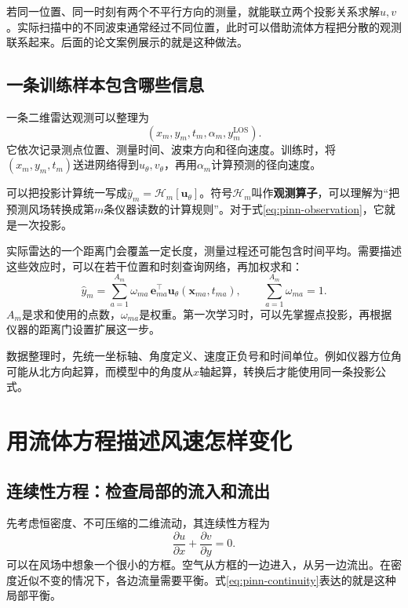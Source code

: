 若同一位置、同一时刻有两个不平行方向的测量，就能联立两个投影关系求解$u,v$。实际扫描中的不同波束通常经过不同位置，此时可以借助流体方程把分散的观测联系起来。后面的论文案例展示的就是这种做法。

\subsection{一条训练样本包含哪些信息}
一条二维雷达观测可以整理为
\[
 (x_m,y_m,t_m,\alpha_m,y_m^{\mathrm{LOS}}).
\]
它依次记录测点位置、测量时间、波束方向和径向速度。训练时，将$(x_m,y_m,t_m)$送进网络得到$u_\theta,v_\theta$，再用$\alpha_m$计算预测的径向速度。

可以把投影计算统一写成$\widehat y_m=\mathcal H_m[\mathbf u_\theta]$。符号$\mathcal H_m$叫作\textbf{观测算子}，可以理解为“把预测风场转换成第$m$条仪器读数的计算规则”。对于式\eqref{eq:pinn-observation}，它就是一次投影。

实际雷达的一个距离门会覆盖一定长度，测量过程还可能包含时间平均。需要描述这些效应时，可以在若干位置和时刻查询网络，再加权求和：
\begin{equation}
 \widehat y_m=\sum_{a=1}^{A_m}\omega_{ma}\,
 \mathbf e_{ma}^{\top}\mathbf u_\theta(\mathbf x_{ma},t_{ma}),
 \qquad \sum_{a=1}^{A_m}\omega_{ma}=1.
\end{equation}
$A_m$是求和使用的点数，$\omega_{ma}$是权重。第一次学习时，可以先掌握点投影，再根据仪器的距离门设置扩展这一步\cite{sathe2013lidar}。

数据整理时，先统一坐标轴、角度定义、速度正负号和时间单位。例如仪器方位角可能从北方向起算，而模型中的角度从$x$轴起算，转换后才能使用同一条投影公式。

\section{用流体方程描述风速怎样变化}
\label{sec:pinn-physics}

\subsection{连续性方程：检查局部的流入和流出}
先考虑恒密度、不可压缩的二维流动，其连续性方程为
\begin{equation}
 \frac{\partial u}{\partial x}+\frac{\partial v}{\partial y}=0.
 \label{eq:pinn-continuity}
\end{equation}
可以在风场中想象一个很小的方框。空气从方框的一边进入，从另一边流出。在密度近似不变的情况下，各边流量需要平衡。式\eqref{eq:pinn-continuity}表达的就是这种局部平衡。

